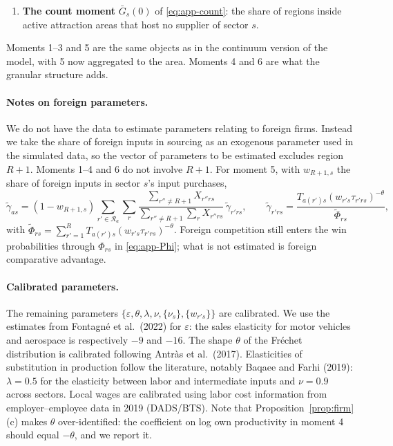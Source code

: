 \begin{enumerate}[topsep=3pt,itemsep=3pt,label=\arabic*.]
\item \textbf{The count moment} $\bar G_{s}(0)$ of \eqref{eq:app-count}: the share of regions
inside active attraction areas that host no supplier of sector $s$.
\end{enumerate}

Moments 1--3 and 5 are the same objects as in the continuum version of the model, with 5 now
aggregated to the area. Moments 4 and 6 are what the granular structure adds.

\paragraph{Notes on foreign parameters.}
\label{app:model-foreign}
We do not have the data to estimate parameters relating to foreign firms. Instead we take the
share of foreign inputs in sourcing as an exogenous parameter used in the simulated data, so the
vector of parameters to be estimated excludes region $R+1$. Moments 1--4 and 6 do not involve
$R+1$. For moment 5, with $w_{R+1,s}$ the share of foreign inputs in sector $s$'s input
purchases,
\begin{equation}
\tilde\gamma_{as}=(1-w_{R+1,s})\sum_{r'\in\mathcal{R}_{a}}\sum_{r}
\frac{\sum_{r''\neq R+1}X_{r''rs}}{\sum_{r''\neq R+1}\sum_{r}X_{r''rs}}\,\tilde\gamma_{r'rs},
\qquad
\tilde\gamma_{r'rs}=\frac{T_{a(r')s}(w_{r's}\tau_{r'rs})^{-\theta}}{\tilde\Phi_{rs}},
\end{equation}
with $\tilde\Phi_{rs}=\sum_{r'=1}^{R}T_{a(r')s}(w_{r's}\tau_{r'rs})^{-\theta}$. Foreign
competition still enters the win probabilities through $\Phi_{rs}$ in \eqref{eq:app-Phi}; what
is not estimated is foreign comparative advantage.

\paragraph{Calibrated parameters.}
\label{app:model-calibration}
The remaining parameters $\{\varepsilon,\theta,\lambda,\nu,\{\nu_{s}\},\{w_{r's}\}\}$ are
calibrated. We use the estimates from Fontagn\'e et al.\ (2022) for $\varepsilon$: the sales
elasticity for motor vehicles and aerospace is respectively $-9$ and $-16$. The shape $\theta$
of the Fr\'echet distribution is calibrated following Antr\`as et al.\ (2017). Elasticities of
substitution in production follow the literature, notably Baqaee and Farhi (2019): $\lambda=0.5$
for the elasticity between labor and intermediate inputs and $\nu=0.9$ across sectors. Local
wages are calibrated using labor cost information from employer--employee data in 2019
(DADS/BTS). Note that Proposition~\ref{prop:firm}(c) makes $\theta$ over-identified: the
coefficient on log own productivity in moment 4 should equal $-\theta$, and we report it.

